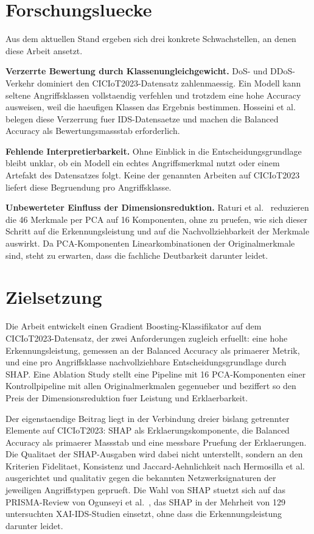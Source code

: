 \documentclass[letterpaper,twocolumn,10pt]{article}
\newcommand{\shap}{SHAP}
\newcommand{\pca}{PCA}
\newcommand{\ba}{Balanced Accuracy}
\newcommand{\gb}{Gradient Boosting}
\newcommand{\ids}{IDS}
\begin{document}
\section{Forschungsluecke}\label{luecke}

Aus dem aktuellen Stand ergeben sich drei konkrete Schwachstellen, an denen diese
Arbeit ansetzt.

\textbf{Verzerrte Bewertung durch Klassenungleichgewicht.}
DoS- und DDoS-Verkehr dominiert den CICIoT2023-Datensatz zahlenmaessig.
Ein Modell kann seltene Angriffsklassen vollstaendig verfehlen und trotzdem eine hohe
Accuracy ausweisen, weil die haeufigen Klassen das Ergebnis bestimmen.
Hosseini et al.~\cite{hosseini2025imbalance} belegen diese Verzerrung fuer
\ids{}-Datensaetze und machen die \ba{} als Bewertungsmassstab erforderlich.

\textbf{Fehlende Interpretierbarkeit.}
Ohne Einblick in die Entscheidungsgrundlage bleibt unklar, ob ein Modell ein echtes
Angriffsmerkmal nutzt oder einem Artefakt des Datensatzes folgt.
Keine der genannten Arbeiten auf CICIoT2023 liefert diese Begruendung pro
Angriffsklasse.

\textbf{Unbewerteter Einfluss der Dimensionsreduktion.}
Raturi et al.~\cite{raturi2026exploratory} reduzieren die 46 Merkmale per \pca{} auf
16 Komponenten, ohne zu pruefen, wie sich dieser Schritt auf die Erkennungsleistung
und auf die Nachvollziehbarkeit der Merkmale auswirkt.
Da \pca{}-Komponenten Linearkombinationen der Originalmerkmale sind, steht zu
erwarten, dass die fachliche Deutbarkeit darunter leidet.

\section{Zielsetzung}\label{ziel}

Die Arbeit entwickelt einen \gb{}-Klassifikator auf dem CICIoT2023-Datensatz, der
zwei Anforderungen zugleich erfuellt: eine hohe Erkennungsleistung, gemessen an der
\ba{} als primaerer Metrik, und eine pro Angriffsklasse nachvollziehbare
Entscheidungsgrundlage durch \shap{}.
Eine Ablation Study stellt eine Pipeline mit 16 \pca{}-Komponenten einer
Kontrollpipeline mit allen Originalmerkmalen gegenueber und beziffert so den
Preis der Dimensionsreduktion fuer Leistung und Erklaerbarkeit.

Der eigenstaendige Beitrag liegt in der Verbindung dreier bislang getrennter Elemente
auf CICIoT2023: \shap{} als Erklaerungskomponente, die \ba{} als primaerer Massstab
und eine messbare Pruefung der Erklaerungen.
Die Qualitaet der \shap{}-Ausgaben wird dabei nicht unterstellt, sondern an den Kriterien
Fidelitaet, Konsistenz und Jaccard-Aehnlichkeit nach Hermosilla et
al.~\cite{hermosilla2025xai_forensic} ausgerichtet und qualitativ gegen die bekannten
Netzwerksignaturen der jeweiligen Angriffstypen geprueft.
Die Wahl von \shap{} stuetzt sich auf das PRISMA-Review von Ogunseyi et
al.~\cite{ogunseyi2026xai_review}, das \shap{} in der Mehrheit von 129 untersuchten
XAI-\ids{}-Studien einsetzt, ohne dass die Erkennungsleistung darunter leidet.

{\footnotesize 
}
\end{document}
